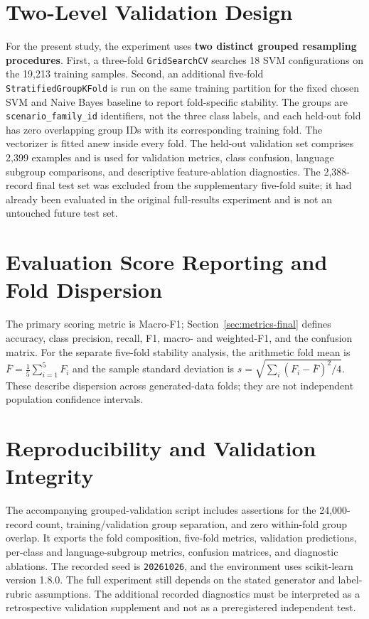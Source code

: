 \section{Two-Level Validation Design}
For the present study, the experiment uses \textbf{two distinct grouped resampling procedures}. First, a three-fold \texttt{GridSearchCV} searches 18 SVM configurations on the 19,213 training samples. Second, an additional five-fold \texttt{StratifiedGroupKFold} is run on the same training partition for the fixed chosen SVM and Naive Bayes baseline to report fold-specific stability. The groups are \texttt{scenario\_family\_id} identifiers, not the three class labels, and each held-out fold has zero overlapping group IDs with its corresponding training fold. The vectorizer is fitted anew inside every fold. The held-out validation set comprises 2,399 examples and is used for validation metrics, class confusion, language subgroup comparisons, and descriptive feature-ablation diagnostics. The 2,388-record final test set was excluded from the supplementary five-fold suite; it had already been evaluated in the original full-results experiment and is not an untouched future test set.

\section{Evaluation Score Reporting and Fold Dispersion}
The primary scoring metric is Macro-F1; Section~\ref{sec:metrics-final} defines accuracy, class precision, recall, F1, macro- and weighted-F1, and the confusion matrix. For the separate five-fold stability analysis, the arithmetic fold mean is $\bar{F}=\frac15\sum_{i=1}^5F_i$ and the sample standard deviation is $s=\sqrt{\sum_i(F_i-\bar F)^2/4}$. These describe dispersion across generated-data folds; they are not independent population confidence intervals.\par

\section{Reproducibility and Validation Integrity}
The accompanying grouped-validation script includes assertions for the 24,000-record count, training/validation group separation, and zero within-fold group overlap. It exports the fold composition, five-fold metrics, validation predictions, per-class and language-subgroup metrics, confusion matrices, and diagnostic ablations. The recorded seed is \texttt{20261026}, and the environment uses scikit-learn version 1.8.0. The full experiment still depends on the stated generator and label-rubric assumptions. The additional recorded diagnostics must be interpreted as a retrospective validation supplement and not as a preregistered independent test.
